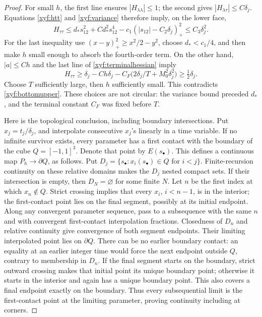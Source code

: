 \begin{proof}
For small \(h\), the first line ensures
\(|H_{\lambda\lambda}|\le1\); the second gives
\(|H_{\lambda\tau}|\le C\delta_j\).  Equations
\eqref{xyf:htt} and \eqref{xyf:variance} therefore imply, on the
lower face,
\begin{equation}
 H_{\tau\tau}\le d_*s_{12}^2
       +C d_*^2s_{12}^4
       -c_1(|s_{12}|-C_2\delta_j)_+^2
       \le C_3\delta_j^2.
 \label{xyf:bottomupper}
\end{equation}
For the last inequality use
\((x-y)_+^2\ge x^2/2-y^2\), choose \(d_*<c_1/4\), and then
make \(h\) small enough to absorb the fourth-order term.
On the other hand, \(|a|\le Ch\) and the last line of
\eqref{xyf:terminalhessian} imply
\[
 H_{\tau\tau}\ge\delta_j-C h\delta_j
                 -C_F\bigl(2\delta_j/T+M_0^2\delta_j^2\bigr)
             \ge\tfrac12\delta_j.
\]
Choose \(T\) sufficiently large, then \(h\) sufficiently small.
This contradicts \eqref{xyf:bottomupper}.  These choices are not
circular: the variance bound preceded \(d_*\), and the terminal
constant \(C_F\) was fixed before \(T\).

Here is the topological conclusion, including boundary intersections.
Put \(x_j=t_j/\delta_j\), and interpolate consecutive \(x_j\)'s
linearly in a time variable.  If no infinite survivor exists, every
parameter has a first contact with the boundary of the cube
\(Q=[-1,1]^3\).  Denote that point by \(E(s_\bullet)\).
This defines a continuous map \(P_h\to\partial Q\), as follows.
Put \(D_j=\{s_\bullet:x_i(s_\bullet)\in Q\text{ for }i<j\}\).
Finite-recursion continuity on these relative domains makes the
\(D_j\) nested compact sets.  If their intersection is empty, then
\(D_N=\varnothing\) for some finite \(N\).
Let \(n\) be the first index at which \(x_n\notin Q\).
Strict crossing implies that every \(x_i\), \(i<n-1\), is in
the interior; the first-contact point lies on the final segment,
possibly at its initial endpoint.  Along any convergent parameter
sequence, pass to a subsequence with the same \(n\) and with
convergent first-contact interpolation fractions.  Closedness of
\(D_n\) and relative continuity give convergence of both segment
endpoints.  Their limiting interpolated point lies on \(\partial Q\).
There can be no earlier boundary contact: an equality at an earlier
integer time would force the next endpoint outside \(Q\), contrary
to membership in \(D_n\).  If the final segment starts on the boundary,
strict outward crossing makes that initial point its unique boundary
point; otherwise it starts in the interior and again has a unique
boundary point.  This also covers a final endpoint exactly on the
boundary.  Thus every subsequential limit is the first-contact point
at the limiting parameter, proving continuity including at corners.


\end{proof}
